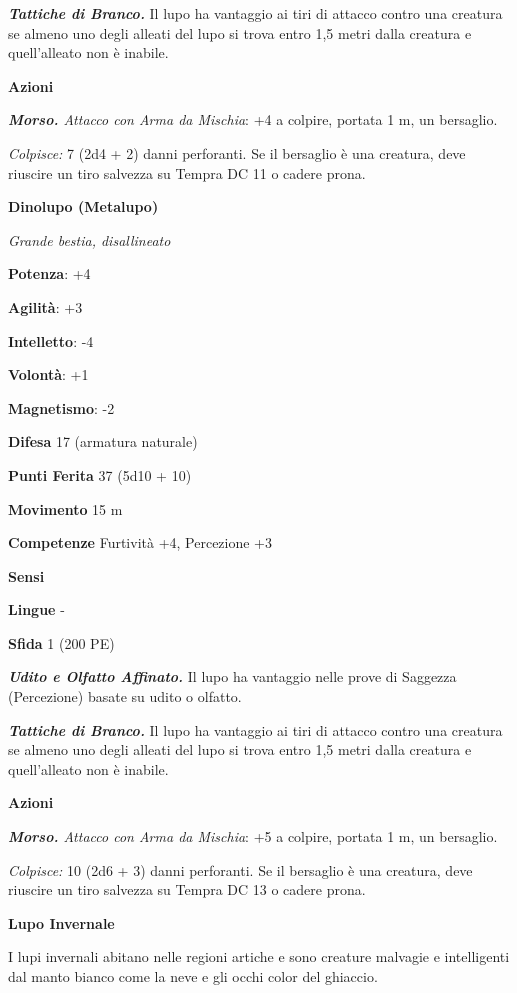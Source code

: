 \begin{multicols}{2}
\emph{\textbf{Tattiche di Branco.}} Il lupo ha vantaggio ai tiri di
attacco contro una creatura se almeno uno degli alleati del lupo si
trova entro 1,5 metri dalla creatura e quell'alleato non è inabile.

\smallskip\textbf{Azioni}

\emph{\textbf{Morso.} Attacco con Arma da Mischia}: +4 a colpire,
portata 1 m, un bersaglio.

\emph{Colpisce:} 7 (2d4 + 2) danni perforanti. Se il bersaglio è una
creatura, deve riuscire un tiro salvezza su Tempra DC 11 o cadere prona.

\textbf{Dinolupo (Metalupo)}

\emph{Grande bestia, disallineato}

\textbf{Potenza}: +4

\textbf{Agilità}: +3

\textbf{Intelletto}: -4

\textbf{Volontà}: +1

\textbf{Magnetismo}: -2

\textbf{Difesa} 17 (armatura naturale)

\textbf{Punti Ferita} 37 (5d10 + 10)

\textbf{Movimento} 15 m

\textbf{Competenze} Furtività +4, Percezione +3

\textbf{Sensi} 

\textbf{Lingue} -

\textbf{Sfida} 1 (200 PE)\smallskip

\emph{\textbf{Udito e Olfatto Affinato.}} Il lupo ha vantaggio nelle
prove di Saggezza (Percezione) basate su udito o olfatto.

\emph{\textbf{Tattiche di Branco.}} Il lupo ha vantaggio ai tiri di
attacco contro una creatura se almeno uno degli alleati del lupo si
trova entro 1,5 metri dalla creatura e quell'alleato non è inabile.

\smallskip\textbf{Azioni}

\emph{\textbf{Morso.} Attacco con Arma da Mischia}: +5 a colpire,
portata 1 m, un bersaglio.

\emph{Colpisce:} 10 (2d6 + 3) danni perforanti. Se il bersaglio è una
creatura, deve riuscire un tiro salvezza su Tempra DC 13 o cadere prona.

\textbf{Lupo Invernale}

I lupi invernali abitano nelle regioni artiche e sono creature malvagie
e intelligenti dal manto bianco come la neve e gli occhi color del
ghiaccio.


\end{multicols}
